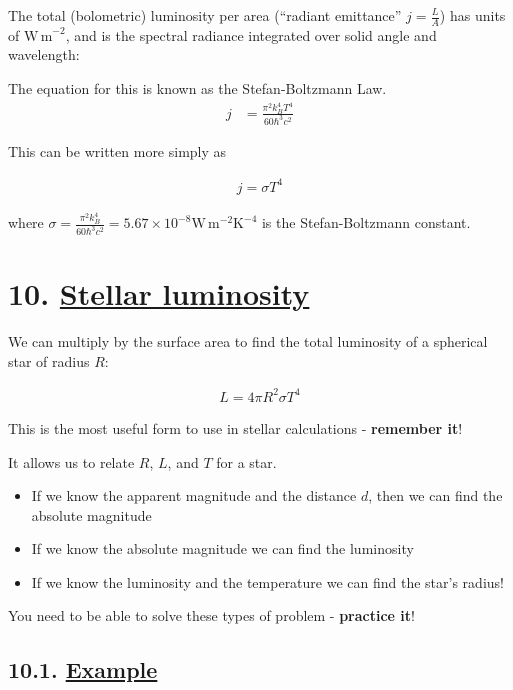 \documentclass[
  letterpaper,
  DIV=11,
  numbers=noendperiod]{scrreprt}
\providecommand{\tightlist}{%
  \setlength{\itemsep}{0pt}\setlength{\parskip}{0pt}}\usepackage{longtable,booktabs,array}
\begin{document}
The total (bolometric) luminosity per area (``radiant emittance''
\(j=\frac{L}{A}\)) has units of \(\mathrm{W\,m}^{-2}\), and is the
spectral radiance integrated over solid angle and wavelength:

The equation for this is known as the Stefan-Boltzmann Law.
\begin{align}
j &= \frac{\pi^2 k_B^4 T^4}{60 \hbar^3 c^2}
\end{align}

This can be written more simply as

\begin{align}
j = \sigma T^4
\end{align}

where
\(\sigma = \frac{\pi^2 k_B^4 }{60 \hbar^3 c^2} = 5.67\times 10^{-8}\mathrm{W\,m^{-2}K^{-4}}\)
is the Stefan-Boltzmann constant.

\hypertarget{stellar-luminosity}{%
\chapter{\texorpdfstring{10. \protect\hyperlink{toc0_}{Stellar
luminosity}}{10. Stellar luminosity}}\label{stellar-luminosity}}

We can multiply by the surface area to find the total luminosity of a
spherical star of radius \(R\):

\begin{align}
L = 4\pi R^2 \sigma T^4
\end{align}

This is the most useful form to use in stellar calculations -
\textbf{remember it}!

It allows us to relate \(R\), \(L\), and \(T\) for a star.

\begin{itemize}
\tightlist
\item
  If we know the apparent magnitude and the distance \(d\), then we can
  find the absolute magnitude
\item
  If we know the absolute magnitude we can find the luminosity
\item
  If we know the luminosity and the temperature we can find the star's
  radius!
\end{itemize}

You need to be able to solve these types of problem - \textbf{practice
it}!

\hypertarget{example-3}{%
\section{\texorpdfstring{10.1.
\protect\hyperlink{toc0_}{Example}}{10.1. Example}}\label{example-3}}
\end{document}
